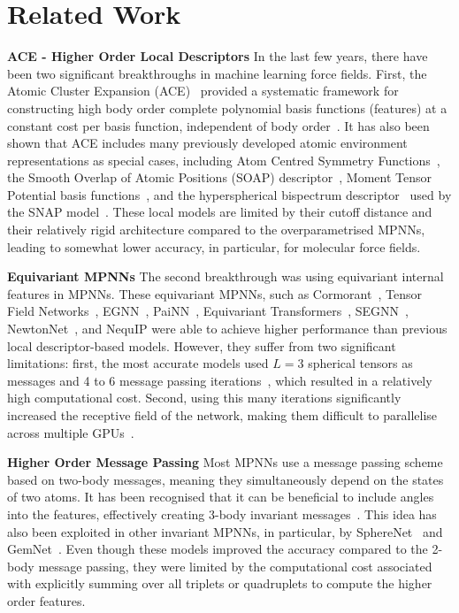 \documentclass{article}
\newcommand*\compactparagraph[1]{\textbf{#1} \quad}
\begin{document}
\section{Related Work}
\label{sec:related_works}

\compactparagraph{ACE - Higher Order Local Descriptors}
In the last few years, there have been two significant breakthroughs in machine learning force fields.
First, the Atomic Cluster Expansion (ACE)~\cite{Drautz2019-er} provided a systematic framework for constructing high body order complete polynomial basis functions (features) at a constant cost per basis function, independent of body order~\cite{dusson2022atomic}.
It has also been shown that ACE includes many previously developed atomic environment representations as special cases, including Atom Centred Symmetry Functions~\cite{Behler2007},
the Smooth Overlap of Atomic Positions (SOAP) descriptor~\cite{Bartok2010-uw},
Moment Tensor Potential basis functions~\cite{MTP},
and the hyperspherical bispectrum descriptor~\cite{Bartok2010-uw} used by the SNAP model~\cite{THOMPSON2015SNAP}.
These local models are limited by their cutoff distance and their relatively rigid architecture compared to the overparametrised MPNNs, leading to somewhat lower accuracy, in particular, for molecular force fields.

\compactparagraph{Equivariant MPNNs}
The second breakthrough was using equivariant internal features in MPNNs.
These equivariant MPNNs, such as Cormorant~\cite{Anderson2019CormorantCM},
Tensor Field Networks~\cite{TensorField2018},
EGNN~\cite{Welling2021EGNN}, PaiNN~\cite{Schutt2021PaiNN},
Equivariant Transformers~\cite{torchmd-net2022},
SEGNN~\cite{Brandstetter2021Geometric},
NewtonNet~\cite{NewtonNet2021},
and NequIP \cite{nequip} were able to achieve higher performance than previous local descriptor-based models.
However, they suffer from two significant limitations:
first, the most accurate models used $L=3$ spherical tensors as messages and 4 to 6 message passing iterations~\cite{nequip}, which resulted in a relatively high computational cost.
Second, using this many iterations significantly increased the receptive field of the network, making them difficult to parallelise across multiple GPUs~\cite{Allegro2022}.

\compactparagraph{Higher Order Message Passing}
Most MPNNs use a message passing scheme based on two-body messages, meaning they simultaneously depend on the states of two atoms. It has been recognised that it can be beneficial to include angles into the features, effectively creating 3-body invariant messages~\cite{DimeNet}.
This idea has also been exploited in other invariant MPNNs,
in particular, by SphereNet~\cite{SphereNet2021} and GemNet~\cite{klicpera2021gemnet}.
Even though these models improved the accuracy compared to the 2-body message passing, they were limited by the computational cost associated with explicitly summing over all triplets or quadruplets to compute the higher order features.
\end{document}
